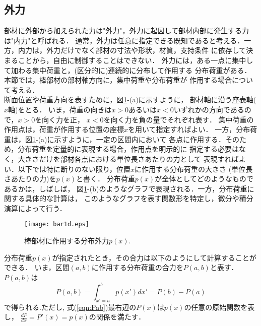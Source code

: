 \documentclass[10pt,a4j]{jbook}
\begin{document}
\subsection{外力}
部材に外部から加えられた力は"外力"，外力に起因して部材内部に発生する力は"内力"と呼ばれる．
通常，外力は任意に指定できる既知であると考える．一方，内力は，外力だけでなく部材の寸法や形状，材質，支持条件
に依存して決まることから，自由に制御することはできない．
外力には，ある一点に集中して加わる集中荷重と，(区分的に)連続的に分布して作用する
分布荷重がある．本節では，棒部材の部材軸方向に，集中荷重や分布荷重が
作用する場合について考える．\\
断面位置や荷重方向を表すために，図\ref{fig:fig0}-(a)に示すように， 
部材軸に沿う座表軸($x$軸)をとる．
いま，荷重の向きは$x>0$あるいは$x<0$いずれかの方向であるので，$x>0$を向く力を正，
$x<0$を向く力を負の量でそれぞれ表す．
集中荷重の作用点は，荷重が作用する位置の座標$x$を用いて指定すればよい．
一方，分布荷重は，図\ref{fig:fig0}-(a)に示すように，一定の区間内において
各点に作用する．そのため，分布荷重を定量的に表現する場合，作用点を明示的に
指定する必要はなく，大きさだけを部材各点における単位長さあたりの力として
表現すればよい．以下では特に断りのない限り，位置$x$に作用する分布荷重の大きさ
(単位長さあたりの力)を$p(x)$と書く．
分布荷重$p(x)$が全体としてどのようなものであるかは，しばしば，
図\ref{fig:fig0}-(b)のようなグラフで表現される．一方，分布荷重に関する具体的な計算は，
このようなグラフを表す関数形を特定し，微分や積分演算によって行う．
\begin{figure}[h]
	\begin{center}
	\texttt{[image: bar1d.eps]} 
	\end{center}
	\caption{棒部材に作用する分布外力$p(x)$.} 
	\label{fig:fig0}
\end{figure}

分布荷重$p(x)$が指定されたとき，その合力は以下のようにして計算することができる．
いま，区間$(a,b)$に作用する分布荷重の合力を$P(a,b)$と表す．$P(a,b)$は
\begin{equation}
	P(a,b)=\int_{x'=a}^{b}p(x')dx'=P(b)-P(a)
	\label{eqn:Pab}
\end{equation}
で得られる.ただし, 式(\ref{eqn:Pab})最右辺の$P(x)$は$p(x)$の任意の原始関数を表し，
$\frac{dP}{dx}=P'(x)=p(x)$の関係を満たす．
\end{document}
